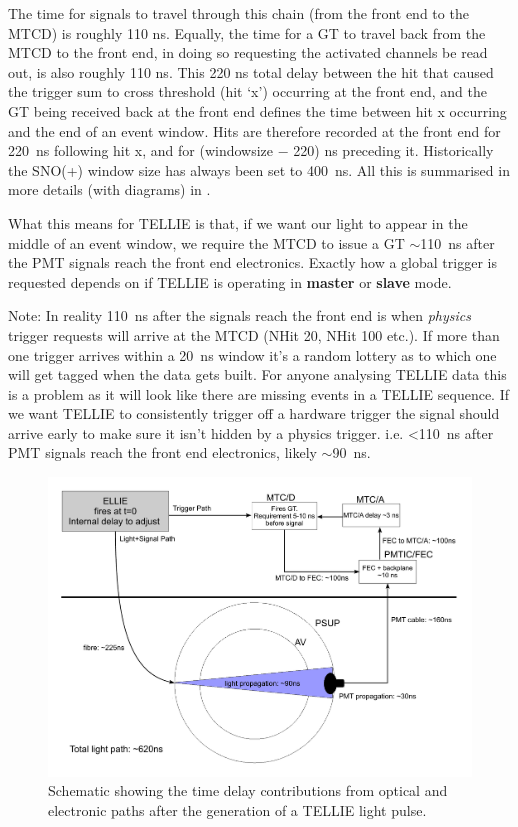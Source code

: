 \documentclass[12pt]{report}
\begin{document}
The time for signals to travel through this chain (from the front end to the MTCD) is roughly 110 ns. Equally, the time for a GT to travel back from the MTCD to the front end, in doing so requesting the activated channels be read out, is also roughly 110 ns. This 220 ns total delay between the hit that caused the trigger sum to cross threshold (hit ‘x’) occurring at the front end, and the GT being received back at the front end defines the time between hit x occurring and the end of an event window. Hits are therefore recorded at the front end for 220~ns following hit x, and for (window\textunderscore size $-$ 220) ns preceding it. Historically the SNO(+) window size has always been set to 400~ns. All this is summarised in more details (with diagrams) in \cite{RATtime}.

What this means for TELLIE is that, if we want our light to appear in the middle of an event window, we require the MTCD to issue a GT $\sim$110~ns after the PMT signals reach the front end electronics. Exactly how a global trigger is requested depends on if TELLIE is operating in \textbf{master} or \textbf{slave} mode. 

Note: In reality 110~ns after the signals reach the front end is when \textit{physics} trigger requests will arrive at the MTCD (NHit 20, NHit 100 etc.). If more than one trigger arrives within a 20~ns window it's a random lottery as to which one will get tagged when the data gets built. For anyone analysing TELLIE data this is a problem as it will look like there are missing events in a TELLIE sequence. If we want TELLIE to consistently trigger off a hardware trigger the signal should arrive early to make sure it isn't hidden by a physics trigger. i.e. \textless110~ns after PMT signals reach the front end electronics, likely $\sim$90~ns.

\begin{figure}[htbp]
	\begin{center}
		\includegraphics[scale=0.5]{ELLIE_timing}
		\caption{Schematic showing the time delay contributions from optical and electronic paths after the generation of a TELLIE light pulse.}
		\label{fig:ELLIE_timing}
	\end{center}
\end{figure}
\end{document}
